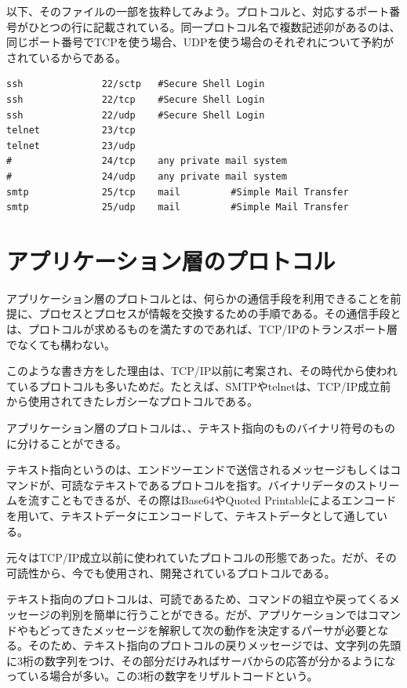 以下、そのファイルの一部を抜粋してみよう。プロトコルと、対応するポート番号がひとつの行に記載されている。同一プロトコル名で複数記述卯があるのは、同じポート番号でTCPを使う場合、UDPを使う場合のそれぞれについて予約がされているからである。

\begin{verbatim}
ssh              22/sctp   #Secure Shell Login
ssh              22/tcp    #Secure Shell Login
ssh              22/udp    #Secure Shell Login
telnet           23/tcp
telnet           23/udp
#                24/tcp    any private mail system
#                24/udp    any private mail system
smtp             25/tcp    mail         #Simple Mail Transfer
smtp             25/udp    mail         #Simple Mail Transfer
\end{verbatim}

\section{アプリケーション層のプロトコル}

アプリケーション層のプロトコルとは、何らかの通信手段を利用できることを前提に、プロセスとプロセスが情報を交換するための手順である。その通信手段とは、プロトコルが求めるものを満たすのであれば、TCP/IPのトランスポート層でなくても構わない。

このような書き方をした理由は、TCP/IP以前に考案され、その時代から使われているプロトコルも多いためだ。たとえば、SMTPやtelnetは、TCP/IP成立前から使用されてきたレガシーなプロトコルである。

アプリケーション層のプロトコルは、、テキスト指向のものバイナリ符号のものに分けることができる。

テキスト指向というのは、エンドツーエンドで送信されるメッセージもしくはコマンドが、可読なテキストであるプロトコルを指す。バイナリデータのストリームを流すこともできるが、その際はBase64やQuoted Printableによるエンコードを用いて、テキストデータにエンコードして、テキストデータとして通している。

元々はTCP/IP成立以前に使われていたプロトコルの形態であった。だが、その可読性から、今でも使用され、開発されているプロトコルである。

テキスト指向のプロトコルは、可読であるため、コマンドの組立や戻ってくるメッセージの判別を簡単に行うことができる。だが、アプリケーションではコマンドやもどってきたメッセージを解釈して次の動作を決定するパーサが必要となる。そのため、テキスト指向のプロトコルの戻りメッセージでは、文字列の先頭に3桁の数字列をつけ、その部分だけみればサーバからの応答が分かるようになっている場合が多い。この3桁の数字をリザルトコードという。


